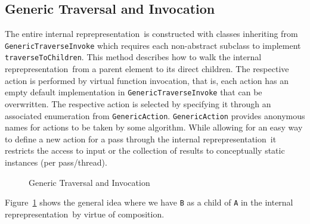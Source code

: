 \documentclass{book}
\newcommand{\InternalRep}{internal reprepresentation}
\begin{document}
\subsection{Generic Traversal and Invocation}
\label{ssec:Generic_Traversal_and_Invocation}
The entire \InternalRep\ is constructed with classes inheriting from {\tt GenericTraverseInvoke}
which requires each non-abstract subclass to implement {\tt traverseToChildren}. This method describes
how to walk the \InternalRep\ from a parent element to its direct children. The respective 
action is performed by virtual function invocation, that is, each action has an empty default implementation 
in {\tt GenericTraverseInvoke} that can be overwritten. The respective action is selected by 
specifying it through an associated enumeration from {\tt GenericAction}. {\tt GenericAction} provides 
anonymous names for actions to be taken by some algorithm. 
While allowing for an easy way to define a new action for a pass through the \InternalRep\ it restricts the access to 
input or the collection of results to conceptually static instances (per pass/thread).
\begin{figure}
\caption{Generic Traversal and Invocation}
\label{fig:Generic_Traversal_and_Invocation}
\end{figure}
Figure~\ref{fig:Generic_Traversal_and_Invocation} shows the general idea where we 
have {\tt B} as a child of {\tt A} in the \InternalRep\ by virtue of composition.
\end{document}
